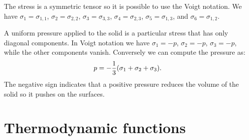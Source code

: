\documentclass[12pt,a4paper,twoside]{report}
\begin{document}
The stress is a symmetric tensor so it is possible to use the Voigt
notation. We have
$\sigma_1=\sigma_{1,1}$,
$\sigma_2=\sigma_{2,2}$, $\sigma_3=\sigma_{3,3}$, $\sigma_4=\sigma_{2,3}$,
$\sigma_5=\sigma_{1,3}$, and $\sigma_6=\sigma_{1,2}$.

A uniform pressure applied to the solid is a particular stress that has
only diagonal components. In Voigt notation we have
$\sigma_1=-p$, $\sigma_2=-p$, $\sigma_3=-p$, while the other components
vanish. Conversely we can compute the pressure as:
\begin{equation}
p=-{1\over 3} (\sigma_1 + \sigma_2 + \sigma_3).
\end{equation}
The negative sign indicates that a positive pressure reduces the
volume of the solid so it pushes on the surfaces.

\newpage
{\color{dark-blue}\chapter{Thermodynamic functions}}
\color{black}
\end{document}

